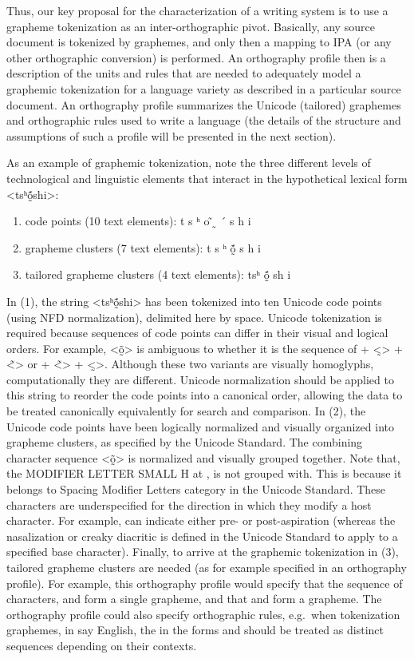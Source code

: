 Thus, our key proposal for the characterization of a writing system is to use a
grapheme tokenization as an inter-orthographic pivot. Basically, any source
document is tokenized by graphemes, and only then a mapping to IPA (or any other
orthographic conversion) is performed. An orthography profile then is a
description of the units and rules that are needed to adequately model a
graphemic tokenization for a language variety as described in a particular
source document. An orthography profile summarizes the Unicode (tailored)
graphemes and orthographic rules used to write a language (the details of the
structure and assumptions of such a profile will be presented in the next
section).

As an example of graphemic tokenization, note the three different levels of
technological and linguistic elements that interact in the hypothetical lexical
form <tsʰṍ̰shi>:

\begin{enumerate}
	\def\labelenumi{\arabic{enumi}.} 
	\item code points (10 text elements): t s ʰ o ̃ ̰ ´ s h i 
	\item grapheme clusters (7 text elements): t s ʰ ṍ̰ s h i 
	\item tailored grapheme clusters (4 text elements): tsʰ ṍ̰ sh i 
\end{enumerate}

In (1), the string <tsʰṍ̰shi> has been tokenized into ten Unicode code points
(using NFD normalization), delimited here by space. Unicode tokenization is
required because sequences of code points can differ in their visual and logical
orders. For example, <õ̰> is ambiguous to whether it is the sequence of + <̰> +
<̃> or + <̃> + <̰>. Although these two variants are visually homoglyphs,
computationally they are different. Unicode normalization should be applied to
this string to reorder the code points into a canonical order, allowing the data
to be treated canonically equivalently for search and comparison. In (2), the
Unicode code points have been logically normalized and visually organized into
grapheme clusters, as specified by the Unicode Standard. The combining character
sequence <õ̰> is normalized and visually grouped together. Note that, the
MODIFIER LETTER SMALL H at , is not grouped with. This is because it
belongs to Spacing Modifier Letters category in the Unicode Standard. These
characters are underspecified for the direction in which they modify a host
character. For example, can indicate either pre- or post-aspiration (whereas the
nasalization or creaky diacritic is defined in the Unicode Standard to apply to
a specified base character). Finally, to arrive at the graphemic tokenization in
(3), tailored grapheme clusters are needed (as for example specified in an
orthography profile). For example, this orthography profile would specify that
the sequence of characters, and form a single grapheme, and that and form a
grapheme. The orthography profile could also specify orthographic rules,
e.g.~when tokenization graphemes, in say English, the in the forms and should be
treated as distinct sequences depending on their contexts.

